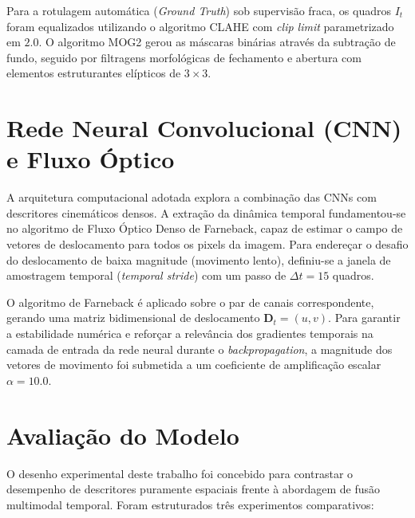 Para a rotulagem automática (\textit{Ground Truth}) sob supervisão fraca, os quadros $I_t$ foram equalizados utilizando o algoritmo CLAHE \cite{zuiderveld1994contrast} com \textit{clip limit} parametrizado em $2.0$. O algoritmo MOG2 \cite{zivkovic2004improved} gerou as máscaras binárias através da subtração de fundo, seguido por filtragens morfológicas de fechamento e abertura com elementos estruturantes elípticos de $3 \times 3$.

\section{Rede Neural Convolucional (CNN) e Fluxo Óptico}
\label{sec:cnn_fluxo}

A arquitetura computacional adotada explora a combinação das CNNs com descritores cinemáticos densos. A extração da dinâmica temporal fundamentou-se no algoritmo de Fluxo Óptico Denso de Farneback, capaz de estimar o campo de vetores de deslocamento para todos os pixels da imagem. Para endereçar o desafio do deslocamento de baixa magnitude (movimento lento), definiu-se a janela de amostragem temporal (\textit{temporal stride}) com um passo de $\Delta t = 15$ quadros.

O algoritmo de Farneback \cite{farneback2003two} é aplicado sobre o par de canais correspondente, gerando uma matriz bidimensional de deslocamento $\mathbf{D}_t = (u, v)$. Para garantir a estabilidade numérica e reforçar a relevância dos gradientes temporais na camada de entrada da rede neural durante o \textit{backpropagation}, a magnitude dos vetores de movimento foi submetida a um coeficiente de amplificação escalar $\alpha = 10.0$.

\section{Avaliação do Modelo}
\label{sec:avaliacao_modelo}

O desenho experimental deste trabalho foi concebido para contrastar o desempenho de descritores puramente espaciais frente à abordagem de fusão multimodal temporal. Foram estruturados três experimentos comparativos:

